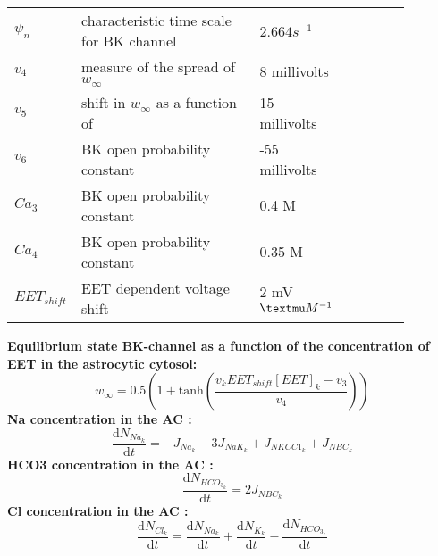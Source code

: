 \documentclass[fleqn]{report}
\numberwithin{equation}{section}
\numberwithin{equation}{section}
\newcommand{\Ca}{\text{Ca$^{2+}$}}
\newcommand{\microM}{\textmu M}
\begin{document}
						\begin{table}[h!]
							\centering
							\begin{tabular}{ p{0.07\linewidth}  >{\footnotesize} p{0.47\linewidth}  >{\footnotesize} p{0.17\linewidth} >{\footnotesize} p{0.17\linewidth} }
								\hline
								$ \psi_{n} $ 	   & characteristic time scale for BK channel	& $2.664 s^{-1}$ 	& \\ 
								$ v_{4} $ 	       	& measure of the spread of $w_{\infty}$	& 8  millivolts 				& \\ 
								$v_{5}$              & shift in $w_{\infty}$ as a function of \Ca & 15 millivolts 			&  \\
								$v_{6}$              & BK open probability constant  & -55 millivolts 			&  \\
								$Ca_{3}$            & BK open probability constant  & 0.4 \microM  &   \\
								$Ca_{4}$            & BK open probability constant  & 0.35 \microM  &   \\
								$EET_{shift}$    &      EET dependent voltage shift & 2  mV $\uM^{-1}$    &   \\
								\hline
							\end{tabular}
						\end{table}
		\textbf{Equilibrium state BK-channel as a function of the concentration of EET in the astrocytic cytosol:}\\
		
		\begin{equation} \label{eq:winf}
		w_{\infty}=0.5 \left(1+\mathrm{tanh}\left(\frac{v_{k}EET_{shift}[EET]_{k}-v_{3} }{v_{4}} \right)  \right) 
		\end{equation}
\textbf{	\gls{Na} concentration in the AC :}
	\begin{equation} \label{eq:NaInt}
	\dfrac{\mathrm{d}N_{Na_k}}{\mathrm{d}t}=-J_{Na_k} - 3 J_{NaK_{k}} + J_{NKCC1_{k}} +  J_{NBC_{k}}
	\end{equation}
\textbf{	\gls{HCO3} concentration in the AC  :}
	\begin{equation} \label{eq:HCOInt}
	\dfrac{\mathrm{d}N_{HCO_{3_k}}}{\mathrm{d}t}= 2 J_{NBC_{k}} 
	\end{equation}
\textbf{	\gls{Cl} concentration in the AC :}
	\begin{equation} \label{eq:ClInt}
	\dfrac{\mathrm{d}N_{Cl_k}}{\mathrm{d}t}= \dfrac{\mathrm{d}N_{Na_k}}{\mathrm{d}t} + \dfrac{\mathrm{d}N_{K_k}}{\mathrm{d}t} - \dfrac{\mathrm{d}N_{HCO_{3_{k}}}}{\mathrm{d}t}
	\end{equation}
\end{document}
